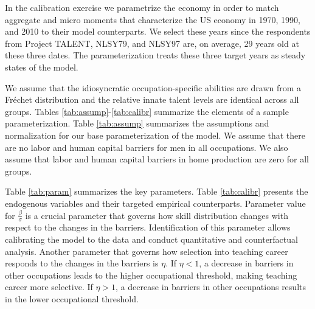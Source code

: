 \documentclass[onehalfspacing,11pt]{article}
\begin{document}
	In the calibration exercise we parametrize the economy in order to match aggregate and micro moments that characterize the US economy in 1970, 1990, and 2010 to their model counterparts. We select these years since the respondents from Project TALENT, NLSY79, and NLSY97 are, on average, 29 years old at these three dates. The parameterization treats these three target years as steady states of the model.
	
	We assume that the idiosyncratic occupation-specific abilities are drawn from a Fr\'echet distribution and the relative innate talent levels are identical across all groups. Tables \ref{tab:assump}-\ref{tab:calibr} summarize the elements of a sample parameterization. Table \ref{tab:assump} summarizes the assumptions and normalization for our base parameterization of the model. We assume that there are no labor and human capital barriers for men in all occupations. We also assume that labor and human capital barriers in home production are zero for all groups.
	
	Table \ref{tab:param} summarizes the key parameters. Table \ref{tab:calibr} presents the endogenous variables and their targeted empirical counterparts. Parameter value for $\frac{\beta}{\sigma}$ is a crucial parameter that governs how skill distribution changes with respect to the changes in the barriers. Identification of this parameter allows calibrating the model to the data and conduct quantitative and counterfactual analysis. Another parameter that governs how selection into teaching career responds to the changes in the barriers is $\eta$. If $\eta<1$, a decrease in barriers in other occupations leads to the higher occupational threshold, making teaching career more selective. If $\eta>1$, a decrease in barriers in other occupations results in the lower occupational threshold.
	
\end{document}
